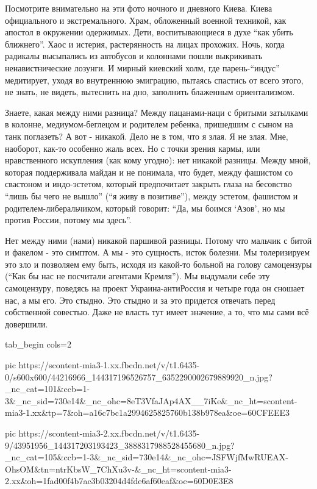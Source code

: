 Посмотрите внимательно на эти фото ночного и дневного Киева. Киева официального
и экстремального. Храм, обложенный военной техникой, как апостол в окружении
одержимых. Дети, воспитывающиеся в духе \enquote{как убить ближнего}. Хаос и истерия,
растерянность на лицах прохожих. Ночь, когда радикалы высыпались из автобусов и
колоннами пошли выкрикивать ненавистнические лозунги. И мирный киевский холм,
где парень-\enquote{индус} медитирует, уходя во внутреннюю эмиграцию, пытаясь спастись
от всего этого, не знать, не видеть, вытеснить на дно, заполнить блаженным
ориентализмом. 

Знаете, какая между ними разница? Между пацанами-наци с бритыми затылками в
колонне, медиумом-беглецом и родителем ребенка, пришедшим с сыном на танк
поглазеть? А вот - никакой. Дело не в том, что я злая. Я не злая. Мне,
наоборот, как-то особенно жаль всех. Но с точки зрения кармы, или нравственного
искупления (как кому угодно): нет никакой разницы. Между мной, которая
поддерживала майдан и не понимала, что будет, между фашистом со свастоном и
индо-эстетом, который предпочитает закрыть глаза на бесовство \enquote{лишь бы
чего не вышло} (\enquote{я живу в позитиве}), между эстетом, фашистом и
родителем-либеральчиком, который говорит: \enquote{Да, мы боимся
\enquote{Азов}, но мы против России, потому мы здесь}. 

Нет между ними (нами) никакой паршивой разницы.  Потому что мальчик с битой и
факелом - это симптом. А мы - это сущность, исток болезни. Мы толеризируем это
зло и позволяем ему быть, исходя из какой-то больной на голову самоцензуры
(\enquote{Как бы нас не посчитали агентами Кремля}). Мы выдумали себе эту
самоцензуру, поведясь на проект Украина-антиРоссия и четыре года он сношает
нас, а мы его. Это стыдно. Это стыдно и за это придется отвечать перед
собственной совестью. Даже не власть тут имеет значение, а то, что мы сами всё
довершили.


\ifcmt
  tab_begin cols=2

     pic https://scontent-mia3-1.xx.fbcdn.net/v/t1.6435-0/s600x600/44216966_144317196526757_6352290002679889920_n.jpg?_nc_cat=101&ccb=1-3&_nc_sid=730e14&_nc_ohc=8eT3VfaJAp4AX__7iKe&_nc_ht=scontent-mia3-1.xx&tp=7&oh=a16c7bc1a2994625825760b138b978ea&oe=60CFEEE3

     pic https://scontent-mia3-2.xx.fbcdn.net/v/t1.6435-9/43951956_144317203193423_3888317988528455680_n.jpg?_nc_cat=105&ccb=1-3&_nc_sid=730e14&_nc_ohc=JSFWjfMwRUEAX-OhsOM&tn=ntrKbsW_7ChXu3v-&_nc_ht=scontent-mia3-2.xx&oh=1fad00f4b7ac3b03204d4fde6af60eaf&oe=60D0E3E8

